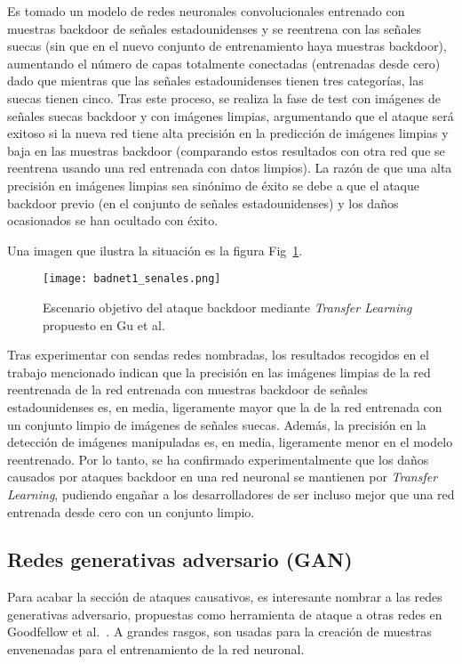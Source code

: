 Es tomado un modelo de redes neuronales convolucionales entrenado con muestras backdoor de señales estadounidenses y se reentrena con las señales suecas (sin que en el nuevo conjunto de entrenamiento haya muestras backdoor), aumentando el número de capas totalmente conectadas (entrenadas desde cero) dado que mientras que las señales estadounidenses tienen tres categorías, las suecas tienen cinco. Tras este proceso, se realiza la fase de test con imágenes de señales suecas backdoor y con imágenes limpias, argumentando que el ataque será exitoso si la nueva red tiene alta precisión en la predicción de imágenes limpias y baja en las muestras backdoor (comparando estos resultados con otra red que se reentrena usando una red entrenada con datos limpios). La razón de que una alta precisión en imágenes limpias sea sinónimo de éxito se debe a que el ataque backdoor previo (en el conjunto de señales estadounidenses) y los daños ocasionados se han ocultado con éxito.

Una imagen que ilustra la situación es la figura Fig~\ref{fig:badnet1}.

	\begin{figure}[h]
    \centering
    \texttt{[image: badnet1\_senales.png]}
    \caption{Escenario objetivo del ataque backdoor mediante \textit{Transfer Learning} propuesto en Gu et al.~\cite{BadNets}}
    \label{fig:badnet1}
\end{figure}

Tras experimentar con sendas redes nombradas, los resultados recogidos en el trabajo mencionado indican que la precisión en las imágenes limpias de la red reentrenada de la red entrenada con muestras backdoor de señales estadounidenses es, en media, ligeramente mayor que la de la red entrenada con un conjunto limpio de imágenes de señales suecas. Además, la precisión en la detección de imágenes manipuladas es, en media, ligeramente menor en el modelo reentrenado. Por lo tanto, se ha confirmado experimentalmente que los daños causados por ataques backdoor en una red neuronal se mantienen por \textit{Transfer Learning}, pudiendo engañar a los desarrolladores de ser incluso mejor que una red entrenada desde cero con un conjunto limpio.

\subsection*{Redes generativas adversario (GAN)}

Para acabar la sección de ataques causativos, es interesante nombrar a las redes generativas adversario, propuestas como herramienta de ataque a otras redes en Goodfellow et al.~\cite{GAN}. A grandes rasgos, son usadas para la creación de muestras envenenadas para el entrenamiento de la red neuronal.

